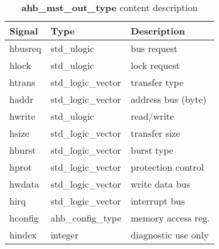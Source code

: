   
\begin{table}[H]
\centering
\label{table:ahbotype}
\begin{tabular}{l l p{55mm}}
\textbf{Signal} & \textbf{Type}      & \textbf{Description}                     \\ \hline \hline  

    hbusreq	& std\_ulogic           & bus request                           \\ \hline
    hlock	& std\_ulogic           & lock request                          \\ \hline
    htrans	& std\_logic\_vector	& transfer type                          \\  \hline
    haddr	& std\_logic\_vector 	& address bus (byte)                    \\ \hline
    hwrite	& std\_ulogic           & read/write                            \\ \hline
    hsize	& std\_logic\_vector	& transfer size                         \\ \hline
    hburst	& std\_logic\_vector	& burst type                             \\  \hline
    hprot	& std\_logic\_vector	& protection control                     \\ \hline
    hwdata	& std\_logic\_vector 	& write data bus                         \\ \hline
    hirq   	& std\_logic\_vector	& interrupt bus                          \\ \hline
    hconfig 	& ahb\_config\_type	& memory access reg.                    \\  \hline
    hindex  	& integer  		& diagnostic use only                   \\ \hline
 \end{tabular}                                                                                                                                 
\caption{\textbf{ahb\_mst\_out\_type} content description}                                                                                            
\end{table}                                                                                               


